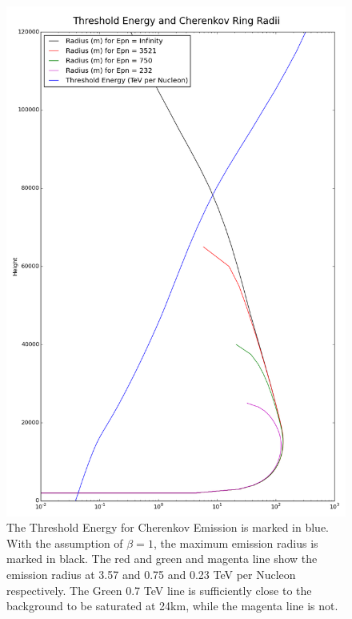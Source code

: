 \documentclass[11pt]{article}
\begin{document}
\begin{figure}
\begin{center}
\includegraphics[height=0.9\textheight]{logenergyradius}
\caption{The Threshold Energy for Cherenkov Emission is marked in blue. With the assumption of $\beta=1$, the maximum emission radius is marked in black. The red and green and magenta line show the emission radius at 3.57 and 0.75 and 0.23 TeV per Nucleon respectively. The Green 0.7 TeV line is sufficiently close to the background to be saturated at 24km, while the magenta line is not.}
\label{fig:generalenergy}
\end{center}
\end{figure}
\end{document}
